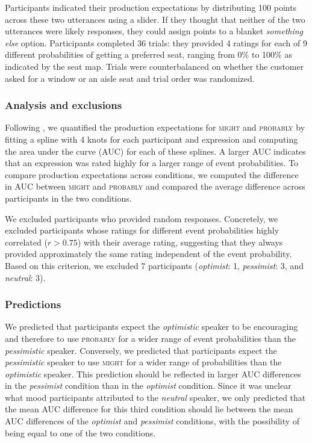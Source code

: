 \documentclass[man,floatsintext]{apa6}
\begin{document}
Participants indicated their production expectations by distributing 100 points across these two utterances using a slider. If they thought that neither of the two utterances were likely responses, they could assign points to a blanket \textit{something else} option. Participants completed 36 trials: they provided  4 ratings for each of 9 different probabilities of getting a preferred seat, ranging from 0\% to 100\% as indicated by the seat map. Trials were counterbalanced on whether the customer asked for a window or an aisle seat and trial order was randomized.


\subsubsection{Analysis and exclusions}

Following , we quantified the production expectations for \textsc{might} and \textsc{probably} by fitting a spline with 4 knots for each participant and expression and computing the area under the curve (AUC) for each of these splines. A larger AUC indicates that an expression was rated highly for a larger range of event probabilities. To compare production expectations across conditions, we computed the difference in AUC between \textsc{might} and \textsc{probably} and compared the average difference across participants in the two conditions.

We excluded participants who provided random responses. Concretely, we excluded participants whose ratings for different event probabilities highly correlated ($r>0.75$) with their average rating, suggesting that they always provided approximately the same rating independent of the event probability. Based on this criterion, we excluded 7 participants (\textit{optimist}: 1, \textit{pessimist}: 3, and \textit{neutral}: 3).

\subsubsection{Predictions}

We predicted that participants expect the \textit{optimistic} speaker to be encouraging and therefore to use \textsc{probably} for a wider range of event probabilities than the \textit{pessimistic} speaker. Conversely, we predicted that participants expect the \textit{pessimistic} speaker to use \textsc{might} for a wider range of probabilities than the \textit{optimistic} speaker. This prediction should be reflected in larger AUC differences in the \textit{pessimist} condition than in the \textit{optimist} condition. Since it was unclear what mood participants attributed to the \textit{neutral} speaker, we only predicted that the mean AUC difference for this third condition should lie between the mean AUC differences of the \textit{optimist} and \textit{pessimist} conditions, with the possibility of being equal to one of the two conditions.
\end{document}
